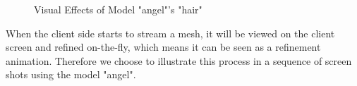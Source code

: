 \begin{figure}
\hfill
{}

\label{fig:angel_visual_effects_hair}
\caption{Visual Effects of Model "angel"'s "hair"}
\end{figure}
When the client side starts to stream a mesh, it will be viewed on the client screen and refined on-the-fly, which means it can be seen as a refinement animation. Therefore we choose to illustrate this process in a sequence of screen shots using the model "angel". 







